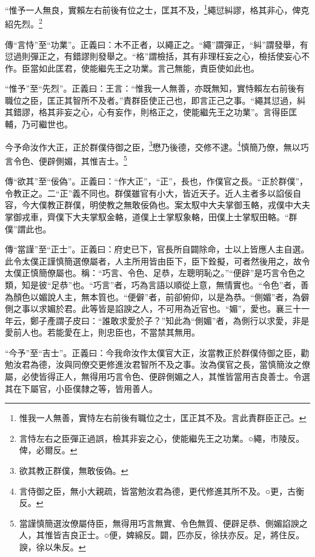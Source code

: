 “惟予一人無良，實賴左右前後有位之士，匡其不及，\footnote{惟我一人無善，實恃左右前後有職位之士，匡正其不及。言此責群臣正己。}繩愆糾謬，格其非心，俾克紹先烈。\footnote{言恃左右之臣彈正過誤，檢其非妄之心，使能繼先王之功業。○繩，市陵反。俾，必爾反。}


{\noindent\zhuan{}\fzbyks 傳“言恃”至“功業”。正義曰：木不正者，以繩正之。“繩”謂彈正，“糾”謂發舉，有愆過則彈正之，有錯謬則發舉之。“格”謂檢括，其有非理枉妄之心，檢括使妄心不作。臣當如此匡君，使能繼先王之功業。言己無能，責臣使如此也。 \par}

{\noindent\shu{}\fzkt “惟予”至“先烈”。正義曰：王言：“惟我一人無善，亦既無知，實恃賴左右前後有職位之臣，匡正其智所不及者。”責群臣使正己也，即言正己之事。“繩其愆過，糾其錯謬，格其非妄之心，心有妄作，則格正之，使能繼先王之功業”。言得臣匡輔，乃可繼世也。 \par}

今予命汝作大正，正於群僕侍御之臣，\footnote{欲其教正群僕，無敢佞偽。}懋乃後德，交修不逮。\footnote{言侍御之臣，無小大親疏，皆當勉汝君為德，更代修進其所不及。○更，古衡反。}慎簡乃僚，無以巧言令色、便辟側媚，其惟吉士。\footnote{當謹慎簡選汝僚屬侍臣，無得用巧言無實、令色無質、便辟足恭、側媚諂諛之人，其惟皆吉良正士。○便，婢綿反。闢，匹亦反，徐扶亦反。足，將住反。諛，徐以朱反。}


{\noindent\zhuan{}\fzbyks 傳“欲其”至“佞偽”。正義曰：“作大正”，“正”，長也，作僕官之長。“正於群僕”，令教正之。二“正”義不同也。群僕雖官有小大，皆近天子。近人主者多以諂佞自容，今大僕教正群僕，明使教之無敢佞偽也。案太馭中大夫掌御玉輅，戎僕中大夫掌御戎車，齊僕下大夫掌馭金輅，道僕上士掌馭象輅，田僕上士掌馭田輅。“群僕”謂此也。 \par}

{\noindent\zhuan{}\fzbyks 傳“當謹”至“正士”。正義曰：府史已下，官長所自闢除命，士以上皆應人主自選。此令太僕正謹慎簡選僚屬者，人主所用皆由臣下，臣下銓擬，可者然後用之，故令太僕正慎簡僚屬也。稱：“巧言、令色、足恭，左聰明恥之。”“便辟”是巧言令色之類，知是彼“足恭”也。“巧言”者，巧為言語以順從上意，無情實也。“令色”者，善為顏色以媚說人主，無本質也。“便僻”者，前卻俯仰，以是為恭。“側媚”者，為僻側之事以求媚於君。此等皆是諂諛之人，不可用為近官也。“媚”，愛也。襄三十一年云，鄭子產謂子皮曰：“誰敢求愛於子？”知此為“側媚”者，為側行以求愛，非是愛前人也。若能愛在上，則忠臣也，不當禁其無用。 \par}

{\noindent\shu{}\fzkt “今予”至“吉士”。正義曰：今我命汝作太僕官大正，汝當教正於群僕侍御之臣，勸勉汝君為德，汝與同僚交更修進汝君智所不及之事。汝為僕官之長，當慎簡汝之僚屬，必使皆得正人，無得用巧言令色、便辟側媚之人，其惟皆當用吉良善士。令選其在下屬官，小臣僕隸之等，皆用善人。 \par}

